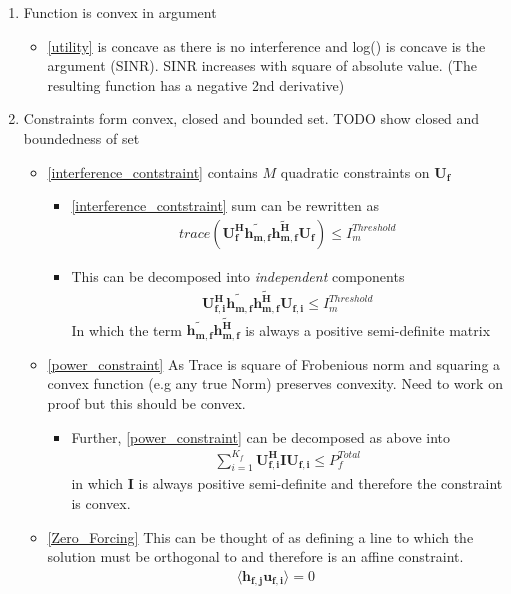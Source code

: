 \documentclass[12pt]{article}
\begin{document}
\begin{enumerate}
\item Function is convex in argument 
\begin{itemize}
\item\eqref{utility} is concave as there is no interference and log() is concave is the argument (SINR). SINR increases with square of absolute value. (The resulting function has a negative 2nd derivative)

\end{itemize}

\item Constraints form convex, closed and bounded set. TODO show closed and boundedness of set

\begin{itemize}

\item\eqref{interference_contstraint} contains $M$ quadratic constraints on $\mathbf{U_f}$
\begin{itemize}
\item \eqref{interference_contstraint} sum can be rewritten as 
\begin{gather}
trace(\mathbf{U_f^H} \mathbf{\tilde{h_{m,f}}} \mathbf{\tilde{h_{m,f}^H}} \mathbf{U_f} )\leq I^{Threshold}_{m}
\end{gather}
\item This can be decomposed into \textit{independent} components 
\begin{gather}
\mathbf{U_{f,i}^H} \mathbf{\tilde{h_{m,f}}} \mathbf{\tilde{h_{m,f}^H}} \mathbf{U_{f,i}} \leq I^{Threshold}_{m}
\end{gather}
In which the term $ \mathbf{\tilde{h_{m,f}}} \mathbf{\tilde{h_{m,f}^H}}$ is always a positive semi-definite matrix
\end{itemize}

\item\eqref{power_constraint} As Trace is square of Frobenious norm and squaring a convex function (e.g any true Norm) preserves convexity.
Need to work on proof but this should be convex.
\begin{itemize}
\item Further, \eqref{power_constraint} can be decomposed as above into
\begin{gather}
\sum_{i=1}^{K_f}\mathbf{U_{f,i}^H} \mathbf{I} \mathbf{U_{f,i}} \leq  P^{Total}_{f}
\end{gather}
in which $\mathbf{I}$ is always positive semi-definite and therefore the constraint is convex.
\end{itemize}

\item\eqref{Zero_Forcing} 
This can be thought of as defining a line to which the solution must be orthogonal to and therefore is an affine constraint. 
\begin{gather}
\langle \mathbf{h_{f,j}}\mathbf{u_{f,i}} \rangle =0
\end{gather}

\end{itemize}
\end{enumerate}
\end{document}
